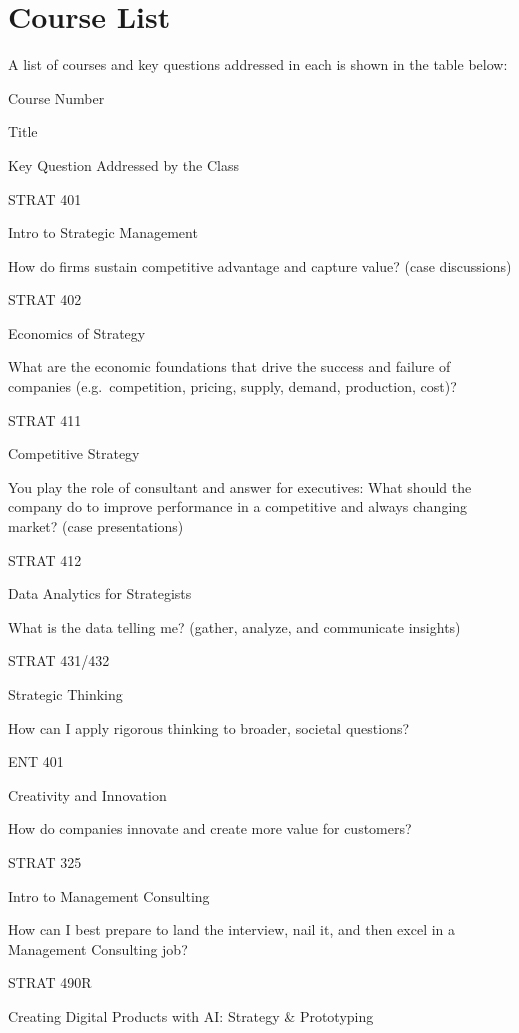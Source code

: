 \documentclass[
  letterpaper,
  DIV=11,
  numbers=noendperiod]{scrreprt}
\begin{document}
\section*{Course List}\label{course-list}


A list of courses and key questions addressed in each is shown in the
table below:

Course Number

Title

Key Question Addressed by the Class

STRAT 401

Intro to Strategic Management

How do firms sustain competitive advantage and capture value? (case
discussions)

STRAT 402

Economics of Strategy

What are the economic foundations that drive the success and failure of
companies (e.g.~competition, pricing, supply, demand, production, cost)?

STRAT 411

Competitive Strategy

You play the role of consultant and answer for executives: What should
the company do to improve performance in a competitive and always
changing market? (case presentations)

STRAT 412

Data Analytics for Strategists

What is the data telling me? (gather, analyze, and communicate insights)

STRAT 431/432

Strategic Thinking

How can I apply rigorous thinking to broader, societal questions?

ENT 401

Creativity and Innovation

How do companies innovate and create more value for customers?

STRAT 325

Intro to Management Consulting

How can I best prepare to land the interview, nail it, and then excel in
a Management Consulting job?

STRAT 490R

Creating Digital Products with AI: Strategy \& Prototyping
\end{document}
